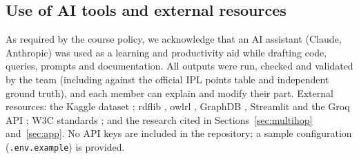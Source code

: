 \subsection*{Use of AI tools and external resources}
As required by the course policy, we acknowledge that an AI assistant (Claude, Anthropic) was used as a learning
and productivity aid while drafting code, queries, prompts and documentation. All outputs were run, checked and
validated by the team (including against the official IPL points table and independent ground truth), and each
member can explain and modify their part. External resources: the Kaggle dataset \citep{kaggleipl2026}; rdflib
\citep{rdflibdocs}, owlrl \citep{owlrldocs}, GraphDB \citep{graphdbdocs}, Streamlit \citep{streamlitdocs} and the
Groq API \citep{groqdocs}; W3C standards \citep{w3c2012owl2profiles,w3c2013sparqlupdate}; and the research cited in
Sections~\ref{sec:multihop} and~\ref{sec:app}. No API keys are included in the repository; a sample
configuration (\texttt{.env.example}) is provided.
